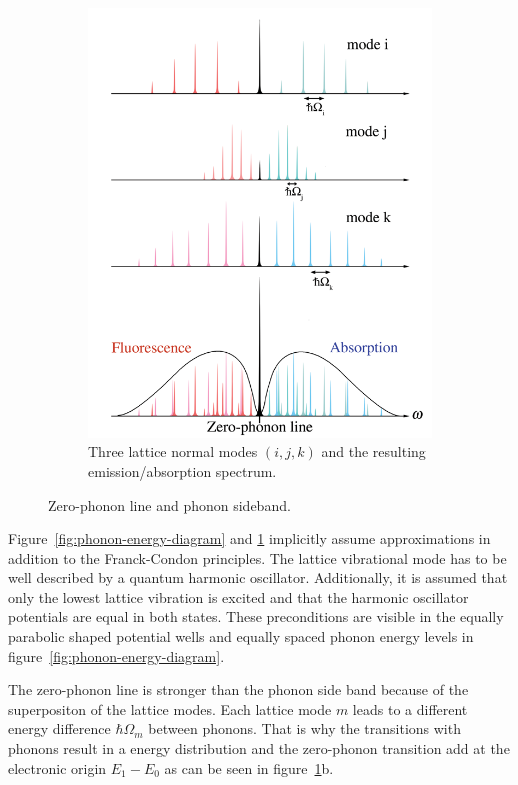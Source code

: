 \begin{figure}[H]
\begin{subfigure}[b]{0.48\textwidth}
		\includegraphics[width=\textwidth]{figures/quantum-dot/Lattice-modes}
		\caption{Three lattice normal modes $(i, j, k)$ and the resulting emission/absorption spectrum.\\}
		\label{fig:lattice-modes}
	\end{subfigure}
	\caption{Zero-phonon line and phonon sideband.~\cite{noauthor_zero-phonon_nodate}}
	\label{fig:zero-phonon-line-phonon-side-band}
\end{figure}
Figure~\ref{fig:phonon-energy-diagram} and \ref{fig:lattice-modes} implicitly assume approximations in addition to the Franck-Condon principles.
The lattice vibrational mode has to be well described by a quantum harmonic oscillator.
Additionally, it is assumed that only the lowest lattice vibration is excited and that the harmonic oscillator potentials are equal in both states.
These preconditions are visible in the equally parabolic shaped potential wells and equally spaced phonon energy levels in figure~\ref{fig:phonon-energy-diagram}.

The zero-phonon line is stronger than the phonon side band because of the superpositon of the lattice modes.
Each lattice mode $m$ leads to a different energy difference $\hbar \Omega_m$ between phonons.
That is why the transitions with phonons result in a energy distribution and the zero-phonon transition add at the electronic origin $E_1 - E_0$ as can be seen in figure~\ref{fig:lattice-modes}b.

